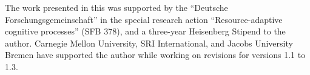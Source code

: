 The work presented in this {\report} was supported by the ``Deutsche
For\-schungs\-gemeinschaft'' in the special research action ``Resource-adaptive cognitive
processes'' (SFB 378), and a three-year Heisenberg Stipend to the author.  Carnegie Mellon
University, SRI International, and Jacobs University Bremen have supported the author
while working on revisions for versions 1.1 to 1.3.



